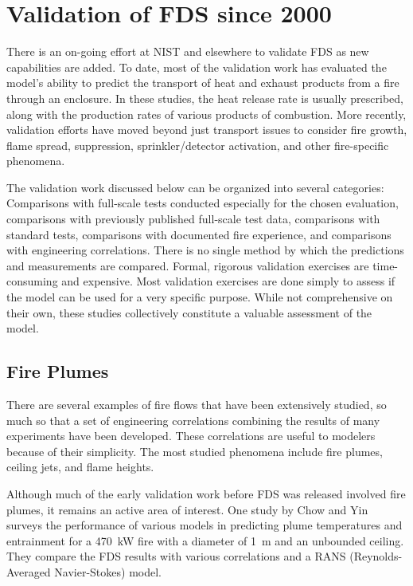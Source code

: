 \section{Validation of FDS since 2000}

There is an  on-going effort at NIST and elsewhere  to validate FDS as new capabilities are  added. To date, most of  the validation work has
evaluated the  model's ability  to predict the  transport of  heat and exhaust products from  a fire through an enclosure.  In these studies, the
heat release rate is usually prescribed, along with the production rates of  various products  of combustion.  More  recently, validation efforts
have moved  beyond  just transport  issues  to consider  fire growth, flame spread,  suppression, sprinkler/detector activation, and other
fire-specific phenomena.

The  validation work  discussed below  can be  organized  into several categories: Comparisons with full-scale tests conducted especially for the
chosen  evaluation,   comparisons   with  previously   published full-scale  test data,  comparisons with  standard  tests, comparisons with
documented  fire experience,  and  comparisons with  engineering correlations.  There is no single  method by which the predictions and measurements
are compared.   Formal, rigorous validation exercises are time-consuming  and  expensive.  Most  validation exercises  are  done simply to assess if
the model can be used for a very specific purpose. While  not  comprehensive on  their  own,  these studies  collectively constitute a valuable
assessment of the model.



\subsection{Fire Plumes}

There are  several examples of  fire flows that have  been extensively studied, so much  so that a set of  engineering correlations combining the results  of   many  experiments   have  been   developed.  These correlations are  useful to modelers because of  their simplicity. The most studied phenomena include fire  plumes, ceiling jets,  and flame heights.

Although much  of the  early validation work  before FDS  was released involved fire plumes, it remains an active area of interest. One study by Chow  and Yin~\cite{Chow:1}  surveys  the  performance of  various models in predicting plume temperatures and entrainment for a 470~kW fire with a diameter of  1~m and an  unbounded ceiling.  They compare the FDS results with various correlations and a  RANS (Reynolds-Averaged Navier-Stokes) model.

